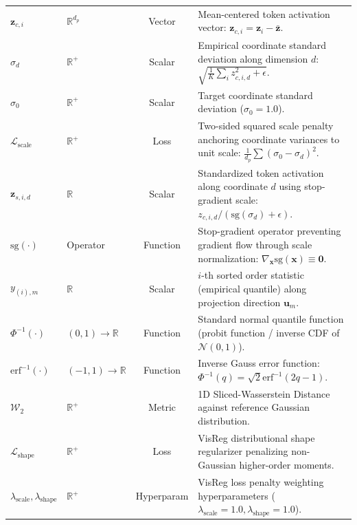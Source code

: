 \documentclass{article}
\begin{document}
\begin{table}[ht]
{\begin{tabular}{llcp{8.6cm}}
$\mathbf{z}_{c, i}$ & $\mathbb{R}^{d_p}$ & Vector & Mean-centered token activation vector: $\mathbf{z}_{c, i} = \mathbf{z}_i - \bar{\mathbf{z}}$. \\
$\sigma_d$ & $\mathbb{R}^+$ & Scalar & Empirical coordinate standard deviation along dimension $d$: $\sqrt{\frac{1}{K} \sum_{i} z_{c, i, d}^2 + \epsilon}$. \\
$\sigma_0$ & $\mathbb{R}^+$ & Scalar & Target coordinate standard deviation ($\sigma_0 = 1.0$). \\
$\mathcal{L}_{\text{scale}}$ & $\mathbb{R}^+$ & Loss & Two-sided squared scale penalty anchoring coordinate variances to unit scale: $\frac{1}{d_p} \sum (\sigma_0 - \sigma_d)^2$. \\
$\mathbf{z}_{s, i, d}$ & $\mathbb{R}$ & Scalar & Standardized token activation along coordinate $d$ using stop-gradient scale: $z_{c, i, d} / (\text{sg}(\sigma_d) + \epsilon)$. \\
$\text{sg}(\cdot)$ & Operator & Function & Stop-gradient operator preventing gradient flow through scale normalization: $\nabla_{\mathbf{x}} \text{sg}(\mathbf{x}) \equiv \mathbf{0}$. \\
$y_{(i), m}$ & $\mathbb{R}$ & Scalar & $i$-th sorted order statistic (empirical quantile) along projection direction $\mathbf{u}_m$. \\
$\Phi^{-1}(\cdot)$ & $(0, 1) \to \mathbb{R}$ & Function & Standard normal quantile function (probit function / inverse CDF of $\mathcal{N}(0, 1)$). \\
$\text{erf}^{-1}(\cdot)$ & $(-1, 1) \to \mathbb{R}$ & Function & Inverse Gauss error function: $\Phi^{-1}(q) = \sqrt{2} \text{erf}^{-1}(2q - 1)$. \\
$\mathcal{W}_2$ & $\mathbb{R}^+$ & Metric & 1D Sliced-Wasserstein Distance against reference Gaussian distribution. \\
$\mathcal{L}_{\text{shape}}$ & $\mathbb{R}^+$ & Loss & VisReg distributional shape regularizer penalizing non-Gaussian higher-order moments. \\
$\lambda_{\text{scale}}, \lambda_{\text{shape}}$ & $\mathbb{R}^+$ & Hyperparam & VisReg loss penalty weighting hyperparameters ($\lambda_{\text{scale}} = 1.0, \lambda_{\text{shape}} = 1.0$). \\
\bottomrule
\end{tabular}%
}
\end{table}
\end{document}
